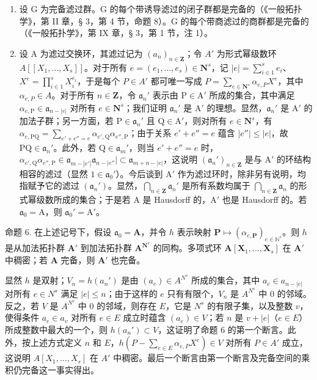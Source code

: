 \begin{enumerate}
\def\labelenumi{(\arabic{enumi})}
\item
  设 G 为完备滤过群。G 的每个带诱导滤过的闭子群都是完备的（《一般拓扑学》，第 II 章，§ 3，第 4 节，命题 8）。G 的每个带商滤过的商群都是完备的（《一般拓扑学》，第 IX 章，§ 3，第 1 节，注 1）。
\item
	设 A 为滤过交换环，其滤过记为 \((a_n)_{n\in \mathbf{Z}}\)；令 \(A'\) 为形式幂级数环 \(A[[X_1,\ldots ,X_s]]\)。对于所有 \(e = (e_1,\dots ,e_s)\in \mathbf{N}^s\)，记 \(|e| = \sum_{i\in 1}^{s}e_i\)、\(X^e = \prod_{i\in 1}^{s}X_i^{e_i}\)，于是每个 \(P\in A'\) 都可唯一写成 \(P = \sum_{e\in \mathbf{N}^s}\alpha_{e,P}X^e\)，其中 \(\alpha_{e,P}\in A\)。对于所有 \(n\in \mathbf{Z}\)，令 \(\mathfrak{a}_n'\) 表示由 \(\mathrm{P} \in \mathrm{A}'\) 所成的集合，其中满足 \(\alpha_{e,\mathrm{P}} \in \mathfrak{a}_{n-|e|}\) 对所有 \(e \in \mathbf{N}^s\)；我们证明 \(\mathfrak{a}_n'\) 是 \(\mathrm{A}'\) 的理想。显然，\(\mathfrak{a}_n'\) 是 \(\mathrm{A}'\) 的加法子群；另一方面，若 \(\mathrm{P} \in \mathfrak{a}_n'\) 且 \(\mathrm{Q} \in \mathrm{A}'\)，则对所有 \(e \in \mathbf{N}^s\)，有 \(\alpha_{e,\mathrm{PQ}} = \sum_{e' + e'' = e} \alpha_{e',\mathrm{Q}} \alpha_{e'',\mathrm{P}}\)；由于关系 \(e' + e'' = e\) 蕴含 \(|e''| \leqslant |e|\)，故 \(\mathrm{PQ} \in \mathfrak{a}_n'\)。此外，若 \(\mathrm{Q} \in \mathfrak{a}_m'\)，则当 \(e' + e'' = e\) 时，\(\alpha_{e',\mathrm{Q}} \alpha_{e'',\mathrm{P}} \in \mathfrak{a}_{m-|e'|} \mathfrak{a}_{n-|e''}| \subset \mathfrak{a}_{m+n-|e|}\)，这说明 \((\mathfrak{a}_n')_{n \in \mathbf{Z}}\) 是与 \(\mathrm{A}'\) 的环结构相容的滤过（显然 \(1 \in \mathfrak{a}_0'\)）。今后谈到 \(\mathrm{A}'\) 作为滤过环时，除非另有说明，均指赋予它的滤过 \((\mathfrak{a}_n')\)。显然，\(\bigcap_{n \in \mathbf{Z}} \mathfrak{a}_n'\) 是所有系数均属于 \(\bigcap_{n \in \mathbf{Z}} \mathfrak{a}_n\) 的形式幂级数所成的集合；于是若 A 是 Hausdorff 的，\(\mathrm{A}'\) 也是 Hausdorff 的。若 \(\mathfrak{a}_0 = \mathrm{A}\)，则 \(\mathfrak{a}_0' = \mathrm{A}'\)。
\end{enumerate}

命题 6. 在上述记号下，假设 \(\mathfrak{a}_0 = \mathbf{A}\)，并令 \(h\) 表示映射 \(\mathbf{P} \mapsto (\alpha_{e,\mathbf{P}})_{e \in \mathbb{N}^s}\)。则 \(h\) 是从加法拓扑群 \(\mathbf{A}'\) 到加法拓扑群 \(\mathbf{A}^{\mathbf{N}^s}\) 的同构。多项式环 \(\mathbf{A}[\mathbf{X}_1, \ldots, \mathbf{X}_s]\) 在 \(\mathbf{A}'\) 中稠密；若 \(\mathbf{A}\) 完备，则 \(\mathbf{A}'\) 也完备。

	显然 \(h\) 是双射；\(V_n = h(a_n')\) 是由 \((a_e) \in A^{N^s}\) 所成的集合，其中 \(a_e \in a_{n-|e|}\) 对所有 \(e \in N^s\) 满足 \(|e| \leqslant n\)；由于这样的 \(e\) 只有有限个，\(V_n\) 是 \(A^{N^s}\) 中 0 的邻域。反之，若 \(V\) 是 \(A^{N^s}\) 中 0 的邻域，则存在 \(E\)，它是 \(N^s\) 的有限子集，以及整数 \(v\)，使得条件 \(a_e \in a_v\) 对所有 \(e \in E\) 成立时蕴含 \((a_e) \in V\)；若 \(n\) 是 \(v + |e|\)（\(e \in E\)）所成整数中最大的一个，则 \(h(a_n') \subset V\)，这证明了命题 6 的第一个断言。此外，按上述方式定义 \(n\) 和 \(E\)，\(h(P - \sum_{e \in E} \alpha_{e, P} X^e) \in V\) 对所有 \(P \in A'\) 成立，这说明 \(A[X_1, \ldots, X_s]\) 在 \(A'\) 中稠密。最后一个断言由第一个断言及完备空间的乘积仍完备这一事实得出。

